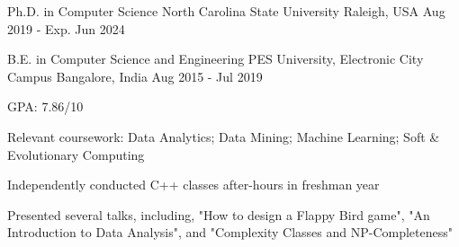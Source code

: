 

\begin{cventries}

  \cventry
    {Ph.D. in Computer Science} %
    {North Carolina State University} %
    {Raleigh, USA} %
    {Aug 2019 - Exp. Jun 2024} %
    {
    }

  \cventry
    {B.E. in Computer Science and Engineering} %
    {PES University, Electronic City Campus} %
    {Bangalore, India} %
    {Aug 2015 - Jul 2019} %
    {
      \begin{cvitems} %
        \item {GPA: 7.86/10}
        \item {Relevant coursework: Data Analytics; Data Mining; Machine Learning; Soft \& Evolutionary Computing}
        \item {Independently conducted C++ classes after-hours in freshman year}
        \item {Presented several talks, including, "How to design a Flappy Bird game", "An Introduction to Data Analysis", and "Complexity Classes and NP-Completeness"}
      \end{cvitems}
    }

\end{cventries}
